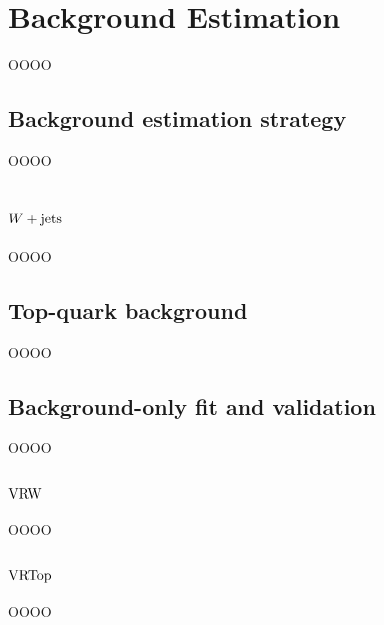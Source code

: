 \chapter{Background Estimation}
\label{chap:chapter-8}

OOOO

\section{Background estimation strategy}
\label{heading:Chapters-CH8-2}

OOOO

\section[W+jets]{$W+\mathrm{jets}$}
\label{heading:Chapters-CH8-3}

OOOO

\section[Top-quark background]{Top-quark background}
\label{heading:Chapters-CH8-4}

OOOO

\section{Background-only fit and validation}
\label{heading:Chapters-CH8-5}

OOOO

\subsection[VRW]{$\mathrm{VRW}$}
\label{heading:Chapters-CH8-6}

OOOO

\subsection[VRTop]{$\mathrm{VRTop}$}
\label{heading:Chapters-CH8-7}

OOOO


